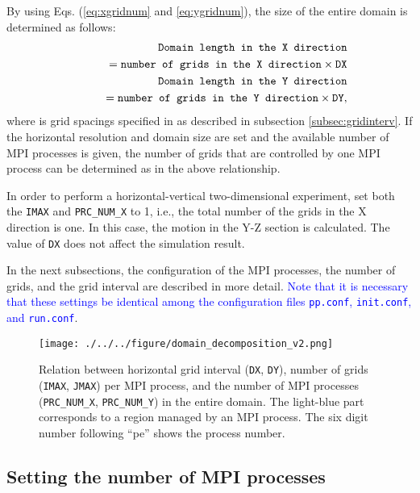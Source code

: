 By using Eqs. (\ref{eq:xgridnum} and \ref{eq:ygridnum}),  the size of the entire domain is determined as follows:
\begin{eqnarray}
&& \verb|Domain length in the X direction| \nonumber\\
&&    \qquad = \verb|number of grids in the X direction| \times \verb|DX|\\
&& \verb|Domain length in the Y direction| \nonumber\\
&&    \qquad = \verb|number of grids in the Y direction| \times \verb|DY|,
\end{eqnarray}
where  is grid spacings specified in  as described in subsection \ref{subsec:gridinterv}.
If the horizontal resolution and domain size are set and the available number of MPI processes is given, the number of grids that are controlled by one MPI process can be determined as in the above relationship.

In order to perform a horizontal-vertical two-dimensional experiment, set both the \texttt{IMAX} and \texttt{PRC\_NUM\_X} to 1, i.e., the total number of the grids in the X direction is one.
In this case, the motion in the Y-Z section is calculated.
The value of \texttt{DX} does not affect the simulation result.

In the next subsections, the configuration of the MPI processes, the number of grids, and the grid interval are described in more detail.  \textcolor{blue}{Note that it is necessary that these settings  be identical among the configuration files \texttt{pp.conf},  \texttt{init.conf}, and \texttt{run.conf}}.

\begin{figure}[h]
\begin{center}
  \texttt{[image: ./../../figure/domain\_decomposition\_v2.png]}\\
  \caption{Relation between horizontal grid interval (\texttt{DX}, \texttt{DY}),
   number of grids (\texttt{IMAX}, \texttt{JMAX}) per MPI process,
   and the number of MPI processes (\texttt{PRC\_NUM\_X}, \texttt{PRC\_NUM\_Y}) in the entire domain.
   The light-blue part corresponds to a region managed by an MPI process.
   The six digit number following ``pe'' shows the process number.}
  \label{fig:domain}
\end{center}
\end{figure}

\subsection{Setting the number of MPI processes} \label{subsec:relation_dom_reso2}

